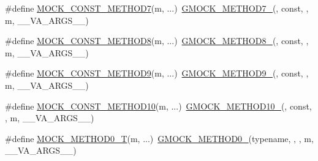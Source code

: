 \begin{DoxyCompactItemize}
\item 
\#define \mbox{\hyperlink{googletest-master_2googlemock_2include_2gmock_2gmock-generated-function-mockers_8h_a0f0e63ed14beab1d85f0160bdbed9930}{M\+O\+C\+K\+\_\+\+C\+O\+N\+S\+T\+\_\+\+M\+E\+T\+H\+O\+D7}}(m, ...)~\mbox{\hyperlink{_obj__test_2lib_2googletest-release-1_88_81_2googlemock_2include_2gmock_2gmock-generated-function-mockers_8h_ab98a8399ba62b53b375c2807f4d39d2f}{G\+M\+O\+C\+K\+\_\+\+M\+E\+T\+H\+O\+D7\+\_\+}}(, const, , m, \+\_\+\+\_\+\+V\+A\+\_\+\+A\+R\+G\+S\+\_\+\+\_\+)
\item 
\#define \mbox{\hyperlink{googletest-master_2googlemock_2include_2gmock_2gmock-generated-function-mockers_8h_a614ee58b7c9ab72e90c850d4bb97a502}{M\+O\+C\+K\+\_\+\+C\+O\+N\+S\+T\+\_\+\+M\+E\+T\+H\+O\+D8}}(m, ...)~\mbox{\hyperlink{_obj__test_2lib_2googletest-release-1_88_81_2googlemock_2include_2gmock_2gmock-generated-function-mockers_8h_aa84a36427c44505207b7cad5dec7ad67}{G\+M\+O\+C\+K\+\_\+\+M\+E\+T\+H\+O\+D8\+\_\+}}(, const, , m, \+\_\+\+\_\+\+V\+A\+\_\+\+A\+R\+G\+S\+\_\+\+\_\+)
\item 
\#define \mbox{\hyperlink{googletest-master_2googlemock_2include_2gmock_2gmock-generated-function-mockers_8h_ab7429646bacf56a7d560a3d81d497880}{M\+O\+C\+K\+\_\+\+C\+O\+N\+S\+T\+\_\+\+M\+E\+T\+H\+O\+D9}}(m, ...)~\mbox{\hyperlink{_obj__test_2lib_2googletest-release-1_88_81_2googlemock_2include_2gmock_2gmock-generated-function-mockers_8h_aa820171a19cc587c247dbe05cbffc55f}{G\+M\+O\+C\+K\+\_\+\+M\+E\+T\+H\+O\+D9\+\_\+}}(, const, , m, \+\_\+\+\_\+\+V\+A\+\_\+\+A\+R\+G\+S\+\_\+\+\_\+)
\item 
\#define \mbox{\hyperlink{googletest-master_2googlemock_2include_2gmock_2gmock-generated-function-mockers_8h_a4f16ede0ef660fb6dc49e5f5d226fbf9}{M\+O\+C\+K\+\_\+\+C\+O\+N\+S\+T\+\_\+\+M\+E\+T\+H\+O\+D10}}(m, ...)~\mbox{\hyperlink{_obj__test_2lib_2googletest-release-1_88_81_2googlemock_2include_2gmock_2gmock-generated-function-mockers_8h_a81a48223a8771de36ef92ac6d56f6e81}{G\+M\+O\+C\+K\+\_\+\+M\+E\+T\+H\+O\+D10\+\_\+}}(, const, , m, \+\_\+\+\_\+\+V\+A\+\_\+\+A\+R\+G\+S\+\_\+\+\_\+)
\item 
\#define \mbox{\hyperlink{googletest-master_2googlemock_2include_2gmock_2gmock-generated-function-mockers_8h_a55a5a1a22cec416ead5605a2da39eec8}{M\+O\+C\+K\+\_\+\+M\+E\+T\+H\+O\+D0\+\_\+T}}(m, ...)~\mbox{\hyperlink{_obj__test_2lib_2googletest-release-1_88_81_2googlemock_2include_2gmock_2gmock-generated-function-mockers_8h_ae0d290ffa58d7c624b2e3487ba1252f4}{G\+M\+O\+C\+K\+\_\+\+M\+E\+T\+H\+O\+D0\+\_\+}}(typename, , , m, \+\_\+\+\_\+\+V\+A\+\_\+\+A\+R\+G\+S\+\_\+\+\_\+)

\end{DoxyCompactItemize}
